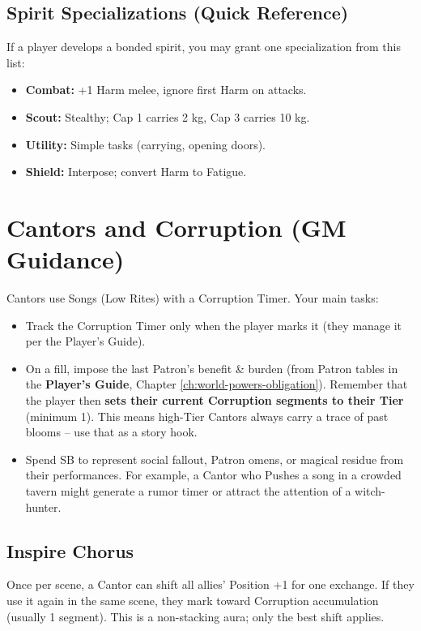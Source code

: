 \subsection*{Spirit Specializations (Quick Reference)}
If a player develops a bonded spirit, you may grant one specialization from this list:
\begin{itemize}
  \item \textbf{Combat:} +1 Harm melee, ignore first Harm on attacks.
  \item \textbf{Scout:} Stealthy; Cap 1 carries 2 kg, Cap 3 carries 10 kg.
  \item \textbf{Utility:} Simple tasks (carrying, opening doors).
  \item \textbf{Shield:} Interpose; convert Harm to Fatigue.
\end{itemize}

\section{Cantors and Corruption (GM Guidance)}
\label{sec:cantors-gm}

Cantors use Songs (Low Rites) with a Corruption Timer. Your main tasks:
\begin{itemize}
  \item Track the Corruption Timer only when the player marks it (they manage it per the Player's Guide).
  \item On a fill, impose the last Patron's benefit \& burden (from Patron tables in the \textbf{Player's Guide}, Chapter \ref{ch:world-powers-obligation}). Remember that the player then \textbf{sets their current Corruption segments to their Tier} (minimum 1). This means high-Tier Cantors always carry a trace of past blooms -- use that as a story hook.
  \item Spend SB to represent social fallout, Patron omens, or magical residue from their performances. For example, a Cantor who Pushes a song in a crowded tavern might generate a rumor timer or attract the attention of a witch-hunter.
\end{itemize}

\subsection*{Inspire Chorus}
\label{subsec:inspire-chorus}
Once per scene, a Cantor can shift all allies' Position +1 for one exchange. If they use it again in the same scene, they mark toward Corruption accumulation (usually 1 segment). This is a non-stacking aura; only the best shift applies.

